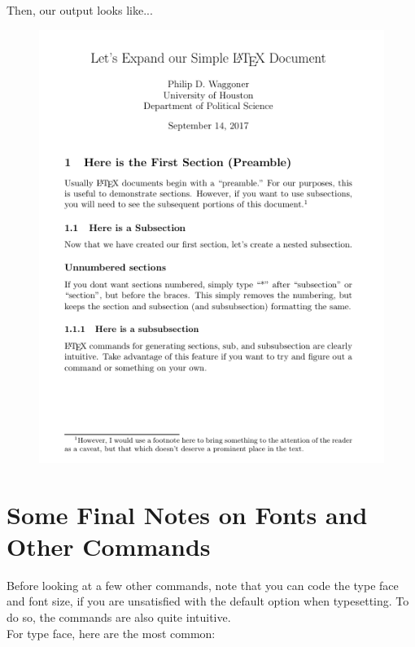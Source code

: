 \documentclass[11pt]{article}
\newcommand{\forceindent}{\leavevmode{\parindent=1.5em\indent}} %
\begin{document}
\newpage

Then, our output looks like...

\begin{figure}[!h]
	\includegraphics[scale=.7]{OUT3} \\ %
	\centering
\end{figure}

\newpage

\section{Some Final Notes on Fonts and Other Commands}

	\forceindent Before looking at a few other commands, note that you can code the type face and font size, if you are unsatisfied with the default option when typesetting. To do so, the commands are also quite intuitive. \\

	For type face, here are the most common: \\
\end{document}
